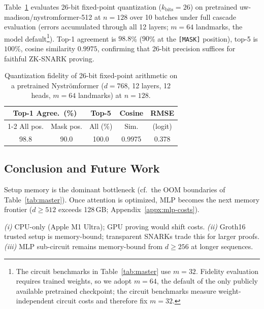\label{subsec:quantization-fidelity}
Table~\ref{tab:quantization} evaluates 26-bit fixed-point quantization ($k_\text{bits}{=}26$) on pretrained uw-madison/nystromformer-512 at $n{=}128$ over 10 batches under full cascade evaluation (errors accumulated through all 12 layers; $m{=}64$ landmarks, the model default\footnote{The circuit benchmarks in Table~\ref{tab:master} use $m{=}32$. Fidelity evaluation requires trained weights, so we adopt $m{=}64$, the default of the only publicly available pretrained checkpoint; the circuit benchmarks measure weight-independent circuit costs and therefore fix $m{=}32$.}). Top-1 agreement is $98.8$\% ($90$\% at the \texttt{[MASK]} position), top-5 is $100$\%, cosine similarity $0.9975$, confirming that 26-bit precision suffices for faithful ZK-SNARK proving.

\begin{table}[H]
\centering
\caption{Quantization fidelity of 26-bit fixed-point arithmetic on a pretrained Nystr\"omformer ($d{=}768$, 12 layers, 12 heads, $m{=}64$ landmarks) at $n{=}128$.}
\label{tab:quantization}
\footnotesize
\setlength{\tabcolsep}{4pt}
\begin{tabular}{@{} ccc cc @{}}
\toprule
\multicolumn{2}{c}{Top-1 Agree.\ (\%)} & Top-5 & Cosine & RMSE \\
\cmidrule(lr){1-2}
All pos. & Mask pos. & All (\%) & Sim. & (logit) \\
\midrule
98.8 & 90.0 & 100.0 & 0.9975 & 0.378 \\
\bottomrule
\end{tabular}
\end{table}

\subsection{Conclusion and Future Work}
\label{subsec:discussion}
 Setup memory is the dominant bottleneck (cf.\ the OOM boundaries of Table~\ref{tab:master}). Once attention is optimized, MLP becomes the next memory frontier ($d{\geq}512$ exceeds 128\,GB; Appendix~\ref{appx:mlp-costs}). 

\emph{(i)} CPU-only (Apple M1 Ultra); GPU proving would shift costs.
\emph{(ii)} Groth16 trusted setup is memory-bound; transparent SNARKs trade this for larger proofs.
\emph{(iii)} MLP sub-circuit remains memory-bound from $d{\geq}256$ at longer sequences.
